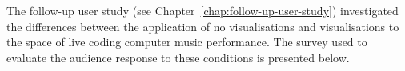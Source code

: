 The follow-up user study (see Chapter~\ref{chap:follow-up-user-study}) investigated the differences between the application of no visualisations and visualisations to the space of live coding computer music performance. The survey used to evaluate the audience response to these conditions is presented below.

\clearpage

\begin{center}
\end{center}

